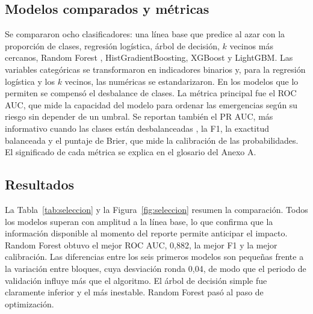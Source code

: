 \documentclass[12pt,a4paper]{article}
\begin{document}
\subsection{Modelos comparados y métricas}

Se compararon ocho clasificadores: una línea base que predice al azar con la proporción de clases, regresión
logística, árbol de decisión, $k$ vecinos más cercanos, Random Forest \citep{breiman2001}, HistGradientBoosting,
XGBoost y LightGBM. Las variables categóricas se transformaron en indicadores binarios y, para la regresión
logística y los $k$ vecinos, las numéricas se estandarizaron. En los modelos que lo permiten se compensó el
desbalance de clases. La métrica principal fue el ROC AUC, que mide la capacidad del modelo para ordenar las
emergencias según su riesgo sin depender de un umbral. Se reportan también el PR AUC, más informativo cuando las
clases están desbalanceadas \citep{saito2015}, la F1, la exactitud balanceada y el puntaje de Brier, que mide la
calibración de las probabilidades. El significado de cada métrica se explica en el glosario del Anexo A.

\subsection{Resultados}

La Tabla~\ref{tab:seleccion} y la Figura~\ref{fig:seleccion} resumen la comparación. Todos los modelos superan con
amplitud a la línea base, lo que confirma que la información disponible al momento del reporte permite anticipar el
impacto. Random Forest obtuvo el mejor ROC AUC, 0,882, la mejor F1 y la mejor calibración. Las diferencias entre
los seis primeros modelos son pequeñas frente a la variación entre bloques, cuya desviación ronda 0,04, de modo
que el periodo de validación influye más que el algoritmo. El árbol de decisión simple fue claramente inferior y el
más inestable. Random Forest pasó al paso de optimización.
\end{document}
